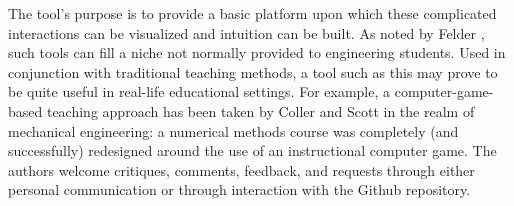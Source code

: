 \documentclass{anstrans}
\begin{document}
The tool's purpose is to provide a basic platform upon which these complicated
interactions can be visualized and intuition can be built. As noted by Felder
\cite{felder2000learning}, such tools can fill a niche not normally provided to
engineering students. Used in conjunction with traditional teaching methods, a
tool such as this may prove to be quite useful in real-life educational
settings. For example, a computer-game-based teaching approach has been taken by
Coller and Scott \cite{Coller2009900}in the realm of mechanical engineering: a
numerical methods course was completely (and successfully) redesigned around
the use of an instructional computer game. The authors welcome critiques,
comments, feedback, and requests through either personal communication or
through interaction with the Github repository.



\end{document}
